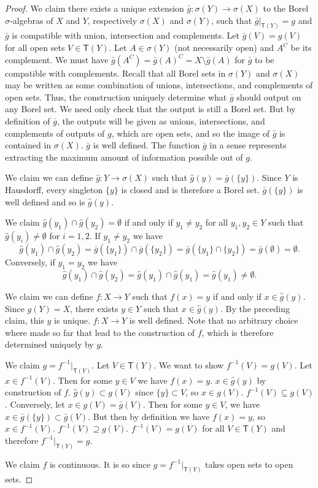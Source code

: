 \documentclass[11pt,letterpaper,fleqn]{memoir} %
\begin{document}
\begin{proof}
	We claim there exists a unique extension $\bar{g}:\sigma(Y)\to\sigma(X)$ to the Borel $\sigma$-algebras of $X$ and $Y$, respectively $\sigma(X)$ and $\sigma(Y)$, such that $\bar{g}|_{\mathsf{T}(Y)}=g$ and $\bar{g}$ is compatible with union, intersection and complements. Let $\bar{g}(V) = g(V)$ for all open sets $V \in \mathsf{T}(Y)$. Let $A \in \sigma(Y)$ (not necessarily open) and $A^C$ be its complement. We must have $\bar{g}(A^C) = \bar{g}(A)^C = X\setminus \bar{g}(A)$ for $\bar{g}$ to be compatible with complements. Recall that all Borel sets in $\sigma(Y)$ and $\sigma(X)$ may be written as some combination of unions, intersections, and complements of open sets. Thus, the construction uniquely determine what $\bar{g}$ should output on any Borel set. We need only check that the output is still a Borel set. But by definition of $\bar{g}$, the outputs will be given as unions, intersections, and complements of outputs of $g$, which are open sets, and so the image of $\bar{g}$ is contained in $\sigma(X)$.  $\bar{g}$ is well defined. The function $\bar{g}$ in a sense represents extracting the maximum amount of information possible out of $g$.
	
	We claim we can define $\hat{g}:Y\to\sigma(X)$ such that $\hat{g}(y) = \bar{g}(\{y\})$. Since $Y$ is Hausdorff, every singleton $\{y\}$ is closed and is therefore a Borel set. $\bar{g}(\{y\})$ is well defined and so is $\hat{g}(y)$.
	
	We claim  $\hat{g}(y_1)\cap\hat{g}(y_2) = \emptyset$ if and only if $y_1\neq y_2$ for all $y_1,y_2\in Y$ such that $\hat{g}(y_i)\neq\emptyset$ for $i=1,2$. If $y_1\neq y_2$ we have
	$$
	\hat{g}(y_1)\cap\hat{g}(y_2) = \bar{g}(\{y_1\})\cap\bar{g}(\{y_2\}) = \bar{g}(\{y_1\}\cap\{y_2\}) = \bar{g}(\emptyset) = \emptyset.
	$$
	Conversely, if $y_1 = y_2$ we have
	$$
	\hat{g}(y_1)\cap\hat{g}(y_2) = 	\hat{g}(y_1)\cap\hat{g}(y_1) = 
	\hat{g}(y_1) \neq \emptyset.
	$$
	
	We claim we can define $f: X\to Y$ such that $f(x) = y$ if and only if $x\in \hat{g}(y)$. Since $g(Y)=X$, there exists $y\in Y$ such that $x\in\hat{g}(y)$. By the preceding claim, this $y$ is unique. $f: X\to Y$ is well defined. Note that no arbitrary choice where made so far that lead to the construction of $f$, which is therefore determined uniquely by $g$. 
	
	We claim $g = f^{-1} |_{\mathsf{T}(Y)}$. Let $V\in\mathsf{T}(Y)$. We want to show $f^{-1}(V) = g(V)$. Let $x\in f^{-1}(V)$. Then for some $y \in V$ we have $f(x)=y$. $x\in \hat{g}(y)$ by construction of $f$. $\hat{g}(y) \subset g(V)$ since $\{y\}\subset V$, so $x\in g(V)$. $f^{-1}(V) \subseteq g(V)$. Conversely, let $x\in g(V)=\bar{g}(V)$. Then for some $y\in V$, we have $x\in\bar{g}(\{y\})\subset\bar{g}(V)$. But then by definition we have $f(x)=y$, so $x\in f^{-1}(V)$. $f^{-1}(V) \supseteq g(V)$. $f^{-1}(V) = g(V)$ for all $V\in\mathsf{T}(Y)$ and therefore $f^{-1}|_{\mathsf{T}(Y)}=g$.
	
	We claim $f$ is continuous. It is so since $g = f^{-1} |_{\mathsf{T}(Y)}$ takes open sets to open sets. 
\end{proof}
\end{document}
